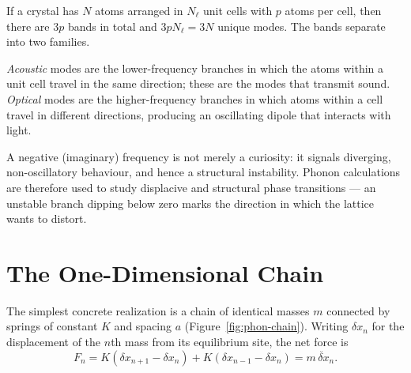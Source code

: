 If a crystal has $N$ atoms arranged in $N_\ell$ unit cells with $p$ atoms per cell, then there are $3p$ bands in total and $3pN_\ell = 3N$ unique modes. The bands separate into two families.

\begin{definition}
\emph{Acoustic} modes are the lower-frequency branches in which the atoms within a unit cell travel in the same direction; these are the modes that transmit sound. \emph{Optical} modes are the higher-frequency branches in which atoms within a cell travel in different directions, producing an oscillating dipole that interacts with light.
\end{definition}

A negative (imaginary) frequency is not merely a curiosity: it signals diverging, non-oscillatory behaviour, and hence a structural instability. Phonon calculations are therefore used to study displacive and structural phase transitions --- an unstable branch dipping below zero marks the direction in which the lattice wants to distort.

\section{The One-Dimensional Chain}

The simplest concrete realization is a chain of identical masses $m$ connected by springs of constant $K$ and spacing $a$ (Figure~\ref{fig:phon-chain}). Writing $\delta x_n$ for the displacement of the $n$th mass from its equilibrium site, the net force is
\begin{equation}
    F_n = K(\delta x_{n+1} - \delta x_n) + K(\delta x_{n-1} - \delta x_n) = m\, \ddot{\delta x}_n.
\end{equation}

